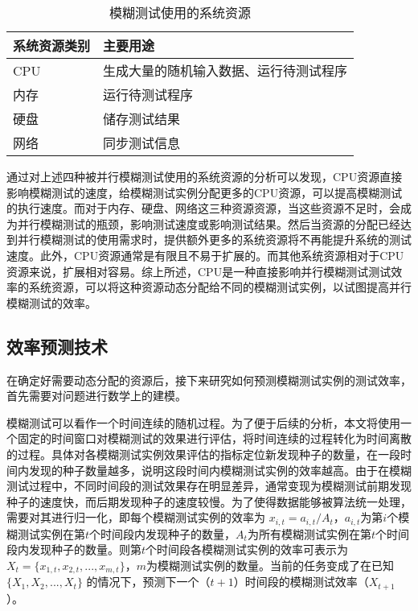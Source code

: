 \documentclass[master]{thesis-uestc}
\begin{document}
\begin{table}[!htbp]
    \caption{模糊测试使用的系统资源}
    \begin{tabular}{ll}
    \toprule
    系统资源类别 & 主要用途 \\
    \midrule
    CPU & 生成大量的随机输入数据、运行待测试程序 \\
    内存 & 运行待测试程序 \\
    硬盘 & 储存测试结果 \\
    网络 & 同步测试信息 \\
    \bottomrule
    \end{tabular}
    \label{table_resource}
    \vspace{6pt}
\end{table}

通过对上述四种被并行模糊测试使用的系统资源的分析可以发现，CPU资源直接影响模糊测试的速度，给模糊测试实例分配更多的CPU资源，可以提高模糊测试的执行速度。而对于内存、硬盘、网络这三种资源资源，当这些资源不足时，会成为并行模糊测试的瓶颈，影响测试速度或影响测试结果。然后当资源的分配已经达到并行模糊测试的使用需求时，提供额外更多的系统资源将不再能提升系统的测试速度。此外，CPU资源通常是有限且不易于扩展的。而其他系统资源相对于CPU资源来说，扩展相对容易。综上所述，CPU是一种直接影响并行模糊测试测试效率的系统资源，可以将这种资源动态分配给不同的模糊测试实例，以试图提高并行模糊测试的效率。


\subsection{效率预测技术}

在确定好需要动态分配的资源后，接下来研究如何预测模糊测试实例的测试效率，首先需要对问题进行数学上的建模。

模糊测试可以看作一个时间连续的随机过程。为了便于后续的分析，本文将使用一个固定的时间窗口对模糊测试的效果进行评估，将时间连续的过程转化为时间离散的过程。具体对各模糊测试实例效果评估的指标定位新发现种子的数量，在一段时间内发现的种子数量越多，说明这段时间内模糊测试实例的效率越高。由于在模糊测试过程中，不同时间段的测试效果存在明显差异，通常变现为模糊测试前期发现种子的速度快，而后期发现种子的速度较慢。为了使得数据能够被算法统一处理，需要对其进行归一化，即每个模糊测试实例的效率为 $x_{i, t} = a_{i,t} / A_t$，$a_{i,t}$为第$i$个模糊测试实例在第$t$个时间段内发现种子的数量，$A_t$为所有模糊测试实例在第$t$个时间段内发现种子的数量。则第$t$个时间段各模糊测试实例的效率可表示为$X_t = \{x_{1, t}, x_{2, t}, ..., x_{m, t}\}$，$m$为模糊测试实例的数量。当前的任务变成了在已知 $\{X_1, X_2, ..., X_t\}$ 的情况下，预测下一个（$t + 1$）时间段的模糊测试效率（$X_{t + 1}$）。
\end{document}
